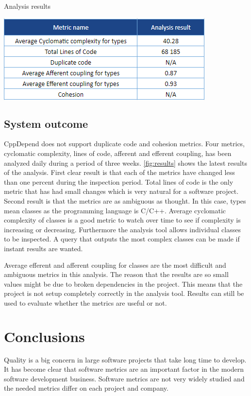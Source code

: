 \begin{table}[t!]
\centering
\caption{Analysis results}
\includegraphics[scale=1]{results.png}
\label{fig:results}
\end{table}

\section{System outcome}
CppDepend does not support duplicate code and cohesion metrics. Four metrics, cyclomatic complexity, lines of code, afferent and efferent coupling, has been analyzed daily during a period of three weeks. \autoref{fig:results} shows the latest results of the analysis. First clear result is that each of the metrics have changed less than one percent during the inspection period. Total lines of code is the only metric that has had small changes which is very natural for a software project. Second result is that the metrics are as ambiguous as thought. In this case, types mean classes as the programming language is C/C++. Average cyclomatic complexity of classes is a good metric to watch over time to see if complexity is increasing or decreasing. Furthermore the analysis tool allows individual classes to be inspected. A query that outputs the most complex classes can be made if instant results are wanted. 

Average efferent and afferent coupling for classes are the most difficult and ambiguous metrics in this analysis. The reason that the results are so small values might be due to broken dependencies in the project. This means that the project is not setup completely correctly in the analysis tool. Results can still be used to evaluate whether the metrics are useful or not.





\chapter{Conclusions}

Quality is a big concern in large software projects that take long time to develop.
It has become clear that software metrics are an important factor in the modern software development business. Software metrics are not very widely studied and the needed metrics differ on each project and company. 

